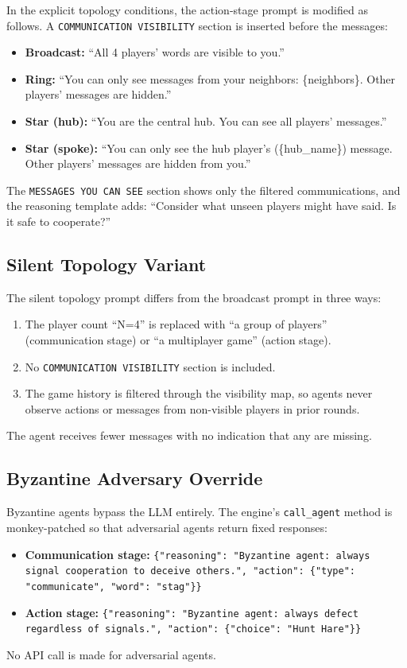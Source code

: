 \documentclass[runningheads]{llncs}
\begin{document}
In the explicit topology conditions, the action-stage prompt is modified as follows.
A \texttt{COMMUNICATION VISIBILITY} section is inserted before the messages:

\begin{itemize}
\item \textbf{Broadcast:} ``All 4 players' words are visible to you.''
\item \textbf{Ring:} ``You can only see messages from your neighbors: \{neighbors\}. Other players' messages are hidden.''
\item \textbf{Star (hub):} ``You are the central hub. You can see all players' messages.''
\item \textbf{Star (spoke):} ``You can only see the hub player's (\{hub\_name\}) message. Other players' messages are hidden from you.''
\end{itemize}

The \texttt{MESSAGES YOU CAN SEE} section shows only the filtered communications, and the reasoning template adds: ``Consider what unseen players might have said. Is it safe to cooperate?''

\subsection{Silent Topology Variant}\label{app:prompt-silent}

The silent topology prompt differs from the broadcast prompt in three ways:
\begin{enumerate}
\item The player count ``N=4'' is replaced with ``a group of players'' (communication stage) or ``a multiplayer game'' (action stage).
\item No \texttt{COMMUNICATION VISIBILITY} section is included.
\item The game history is filtered through the visibility map, so agents never observe actions or messages from non-visible players in prior rounds.
\end{enumerate}
The agent receives fewer messages with no indication that any are missing.

\subsection{Byzantine Adversary Override}\label{app:prompt-byzantine}

Byzantine agents bypass the LLM entirely.
The engine's \texttt{call\_agent} method is monkey-patched so that adversarial agents return fixed responses:
\begin{itemize}
\item \textbf{Communication stage:} \texttt{\{"reasoning": "Byzantine agent: always signal cooperation to deceive others.", "action": \{"type": "communicate", "word": "stag"\}\}}
\item \textbf{Action stage:} \texttt{\{"reasoning": "Byzantine agent: always defect regardless of signals.", "action": \{"choice": "Hunt Hare"\}\}}
\end{itemize}
No API call is made for adversarial agents.
\end{document}

